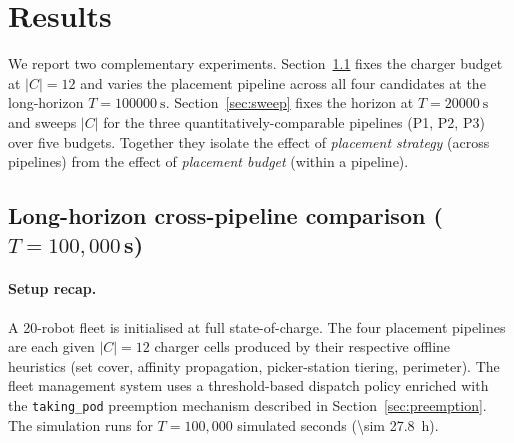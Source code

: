 %
%
%

\section{Results}
\label{sec:results}

We report two complementary experiments. Section~\ref{sec:r100k}
fixes the charger budget at $|C| = 12$ and varies the placement
pipeline across all four candidates at the long-horizon
$T = \SI{100000}{\second}$. Section~\ref{sec:sweep} fixes the
horizon at $T = \SI{20000}{\second}$ and sweeps $|C|$ for the three
quantitatively-comparable pipelines (P1, P2, P3) over five budgets.
Together they isolate the effect of \emph{placement strategy} (across
pipelines) from the effect of \emph{placement budget} (within a
pipeline).

\subsection{Long-horizon cross-pipeline comparison ($T = 100{,}000$\,s)}
\label{sec:r100k}

\paragraph{Setup recap.} A 20-robot fleet is initialised at full
state-of-charge. The four placement pipelines are each given
$|C| = 12$ charger cells produced by their respective offline
heuristics (set cover, affinity propagation, picker-station
tiering, perimeter). The fleet management system uses a
threshold-based dispatch policy enriched with the
\texttt{taking\_pod} preemption mechanism described in
Section~\ref{sec:preemption}. The simulation runs for
$T = 100{,}000$ simulated seconds (\SI{\sim 27.8}{\hour}).

